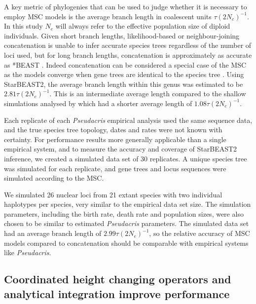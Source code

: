\documentclass[12pt]{article}
\begin{document}
A key metric of phylogenies that can be used to judge whether it is necessary
to employ MSC models is the average branch length in coalescent units
$\tau(2N_e)^{-1}$. In this study $N_e$ will always refer to the
effective population size of diploid individuals. Given short branch lengths,
likelihood-based or neighbour-joining concatenation is unable to infer accurate
species trees regardless of the number of loci used, but for long branch
lengths, concatenation is approximately as accurate as *BEAST
\citep{Ogilvie01052016}. Indeed concatenation can be considered a special
case of the MSC as the models converge when gene
trees are identical to the species tree \citep{NYAS:NYAS12747}. Using StarBEAST2, the average branch length within
this genus was estimated to be $2.81\tau(2N_e)^{-1}$. This is an
intermediate average length compared to the shallow simulations analysed by
\cite{Ogilvie01052016} which had a shorter average length of
$1.08\tau(2N_e)^{-1}$.

Each replicate of each \textit{Pseudacris} empirical analysis used the same
sequence data, and the true species tree topology, dates and rates were not
known with certainty. For performance results more generally applicable than a
single empirical system, and to measure the accuracy and coverage of
StarBEAST2 inference, we created a simulated data set of 30 replicates. A
unique species tree was simulated for each replicate, and gene trees and locus
sequences were simulated according to the MSC.

We simulated 26 nuclear loci from 21 extant species with two individual
haplotypes per species, very similar to the empirical data set size. The
simulation parameters, including the birth rate, death rate and population
sizes, were also chosen to be similar to estimated \textit{Pseudacris}
parameters. The simulated data set had an average branch length of
$2.99\tau(2N_e)^{-1}$, so the relative accuracy of MSC models compared
to concatenation should be comparable with empirical systems like
\textit{Pseudacris}.

\subsection{Coordinated height changing operators and analytical integration improve performance}
\end{document}
